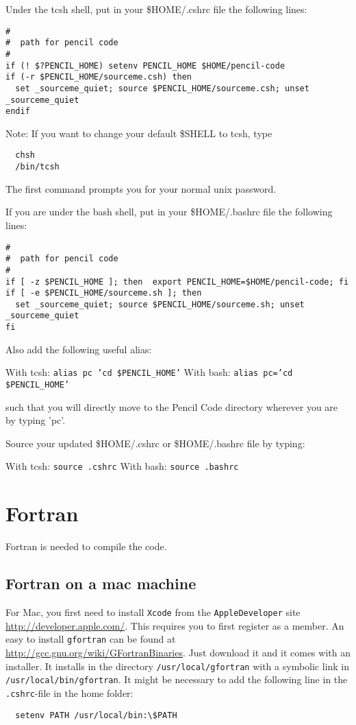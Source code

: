 \documentclass[a4paper,12pt]{article}
\begin{document}
Under the tcsh shell, put in your \$HOME/.cshrc file the following lines:
\begin{verbatim}
#
#  path for pencil code
#
if (! $?PENCIL_HOME) setenv PENCIL_HOME $HOME/pencil-code
if (-r $PENCIL_HOME/sourceme.csh) then
  set _sourceme_quiet; source $PENCIL_HOME/sourceme.csh; unset _sourceme_quiet
endif
\end{verbatim}

Note: If you want to change your default \$SHELL to tcsh, type

\begin{verbatim}
  chsh
  /bin/tcsh
\end{verbatim}

The first command prompts you for your normal unix password.

If you are under the bash shell, put in your \$HOME/.bashrc file the following
lines:
\begin{verbatim}
#
#  path for pencil code
#
if [ -z $PENCIL_HOME ]; then  export PENCIL_HOME=$HOME/pencil-code; fi
if [ -e $PENCIL_HOME/sourceme.sh ]; then
  set _sourceme_quiet; source $PENCIL_HOME/sourceme.sh; unset _sourceme_quiet
fi
\end{verbatim}

Also add the following useful alias:

With tcsh: \texttt{alias pc 'cd \$PENCIL\_HOME'}
With bash: \texttt{alias pc='cd \$PENCIL\_HOME'}

such that you will directly move to the Pencil Code directory wherever you are
by typing 'pc'.

Source your updated \$HOME/.cshrc or \$HOME/.bashrc file by typing:

With tcsh: \texttt{source .cshrc}
With bash: \texttt{source .bashrc}


\section{Fortran}
Fortran is needed to compile the code. 
\subsection{Fortran on a mac machine}
For Mac, you first need to install \verb|Xcode| from the \verb|AppleDeveloper|
site \url{http://developer.apple.com/}. This requires you to first register as a
member. An easy to install \verb|gfortran| can be found at \newline
\url{http://gcc.gnu.org/wiki/GFortranBinaries}. Just download it and it comes
with an installer. It installs in the directory \verb|/usr/local/gfortran| with
a symbolic link in \verb|/usr/local/bin/gfortran|. It might be necessary to add
the following line in the \verb|.cshrc|-file in the home folder:
\begin{verbatim} 
  setenv PATH /usr/local/bin:\$PATH 
\end{verbatim}
\end{document}
